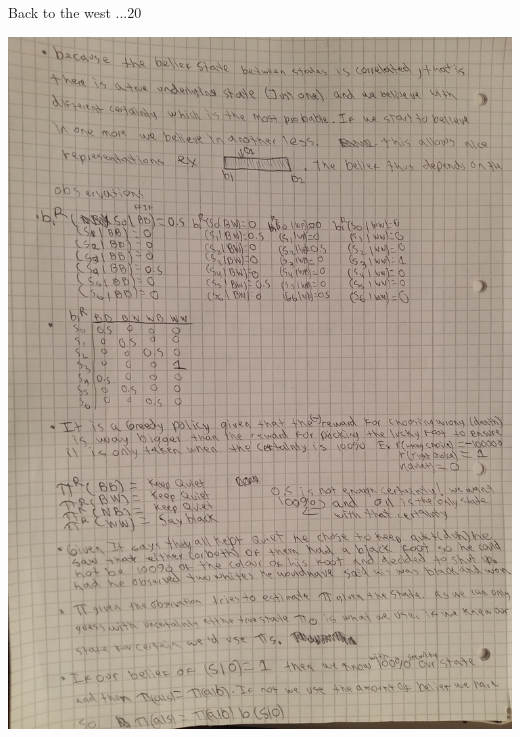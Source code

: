 \begin{questions}
\begin{question}{Back to the west ...}{20}
\begin{answer}
	\includegraphics[scale=0.2]{p4.jpg}	
		\newpage


\end{answer}
\end{question}
\end{questions}
